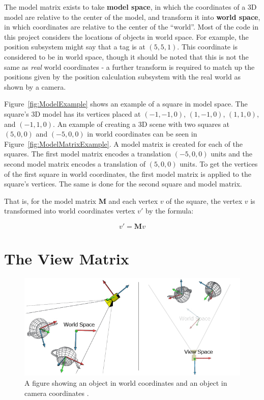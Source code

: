 The model matrix exists to take \textbf{model space}, in which the coordinates of a 3D model are relative to the center of the model, and transform it into \textbf{world space}, in which coordinates are relative to the center of the ``world''. Most of the code in this project considers the locations of objects in world space. For example, the position subsystem might say that a tag is at $(5, 5, 1)$. This coordinate is considered to be in world space, though it should be noted that this is not the same as \emph{real} world coordinates - a further transform is required to match up the positions given by the position calculation subsystem with the real world as shown by a camera.

Figure~\ref{fig:ModelExample} shows an example of a square in model space. The square's 3D model has its vertices placed at $(-1, -1, 0)$, $(1, -1, 0)$, $(1, 1, 0)$, and $(-1, 1, 0)$. An example of creating a 3D scene with two squares at $(5, 0, 0)$ and $(-5, 0, 0)$ in world coordinates can be seen in Figure~\ref{fig:ModelMatrixExample}. A model matrix is created for each of the squares. The first model matrix encodes a translation $(-5, 0, 0)$ units and the second model matrix encodes a translation of $(5, 0, 0)$ units. To get the vertices of the first square in world coordinates, the first model matrix is applied to the square's vertices. The same is done for the second square and model matrix. 

That is, for the model matrix $\mathbf{M}$ and each vertex $v$ of the square, the vertex $v$ is transformed into world coordinates vertex $v'$ by the formula:

\[v' = \mathbf{M}v \]

\section{The View Matrix}
\begin{figure}
	\centering
	\includegraphics[width=\linewidth]{Figures/WorldToView.png}
	\decoRule
	\caption{A figure showing an object in world coordinates and an object in camera coordinates \cite{CodingLabs}.}
	\label{fig:WorldToView}
\end{figure}


